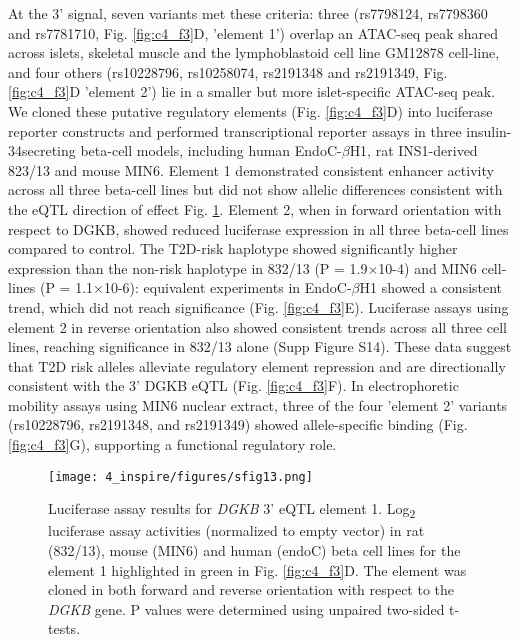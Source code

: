 At the 3' signal, seven variants met these criteria: three (rs7798124, rs7798360 and rs7781710, Fig. \ref{fig:c4_f3}D, 'element 1') overlap an ATAC-seq peak shared across islets, skeletal muscle and the lymphoblastoid cell line GM12878 \cite{buenrostroTranspositionNativeChromatin2013} cell-line, and four others (rs10228796, rs10258074, rs2191348 and rs2191349, Fig. \ref{fig:c4_f3}D 'element 2') lie in a smaller but more islet-specific ATAC-seq peak. We cloned these putative regulatory elements (Fig. \ref{fig:c4_f3}D) into luciferase reporter constructs and performed transcriptional reporter assays in three insulin-34secreting beta-cell models, including human EndoC-$\beta$H1, rat INS1-derived 823/13 and mouse MIN6. Element 1 demonstrated consistent enhancer activity across all three beta-cell lines but did not show allelic differences consistent with the eQTL direction of effect Fig. \ref{fig:c4_sf13}. Element 2, when in forward orientation with respect to DGKB, showed reduced luciferase expression in all three beta-cell lines compared to control. The T2D-risk haplotype showed significantly higher expression than the non-risk haplotype in 832/13 (P = 1.9×10-4) and MIN6 cell-lines (P = 1.1×10-6): equivalent experiments in EndoC-$\beta$H1 showed a consistent trend, which did not reach significance (Fig. \ref{fig:c4_f3}E). Luciferase assays using element 2 in reverse orientation also showed consistent trends across all three cell lines, reaching significance in 832/13 alone (Supp Figure S14). These data suggest that T2D risk alleles alleviate regulatory element repression and are directionally consistent with the 3' DGKB eQTL (Fig. \ref{fig:c4_f3}F). In electrophoretic mobility assays using MIN6 nuclear extract, three of the four 'element 2' variants (rs10228796, rs2191348, and rs2191349) showed allele-specific binding (Fig. \ref{fig:c4_f3}G), supporting a functional regulatory role.

\begin{figure}
    \centering
    \texttt{[image: 4\_inspire/figures/sfig13.png]}
    \caption[Luciferase assay results for \textit{DGKB} 3' eQTL element 1]{Luciferase assay results for \textit{DGKB} 3' eQTL element 1. Log\textsubscript{2} luciferase assay activities (normalized to empty vector) in rat (832/13), mouse (MIN6) and human (endoC) beta cell lines for the element 1 highlighted in green in Fig. \ref{fig:c4_f3}D. The element was cloned in both forward and reverse orientation with respect to the \textit{DGKB} gene. P values were determined using unpaired two-sided t-tests.}
    \label{fig:c4_sf13}
\end{figure}


